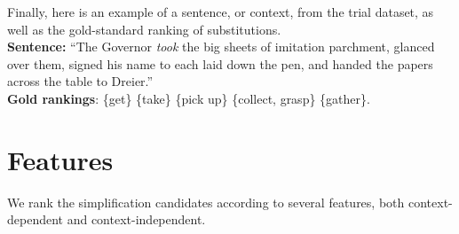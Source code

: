 \documentclass[10pt, a4paper]{article}
\begin{document}
Finally, here is an example of a sentence, or context, from the trial dataset, as well as the gold-standard ranking of substitutions. \\
\textbf{Sentence:} ``The Governor \textit{took} the big sheets of imitation parchment, glanced over them, signed his name to each  laid down the pen, and handed the papers across the table to Dreier.'' \\
\textbf{Gold rankings}: \{get\} \{take\} \{pick up\} \{collect, grasp\} \{gather\}.

\section{Features}

We rank the simplification candidates according to several features, both context-dependent and context-independent. \paragraph{}
\end{document}
